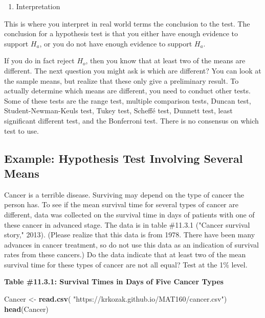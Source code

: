 \documentclass[
]{book}
\newenvironment{Shaded}{\begin{snugshade}}{\end{snugshade}}
\newcommand{\KeywordTok}[1]{\textcolor[rgb]{0.13,0.29,0.53}{\textbf{#1}}}
\newcommand{\NormalTok}[1]{#1}
\newcommand{\StringTok}[1]{\textcolor[rgb]{0.31,0.60,0.02}{#1}}
\providecommand{\tightlist}{%
  \setlength{\itemsep}{0pt}\setlength{\parskip}{0pt}}
\begin{document}
\begin{enumerate}
\def\labelenumi{\arabic{enumi}.}
\setcounter{enumi}{5}
\tightlist
\item
  Interpretation
\end{enumerate}

This is where you interpret in real world terms the conclusion to the test. The conclusion for a hypothesis test is that you either have enough evidence to support \(H_a\), or you do not have enough evidence to support \(H_a\).

If you do in fact reject \(H_o\), then you know that at least two of the means are different. The next question you might ask is which are different? You can look at the sample means, but realize that these only give a preliminary result. To actually determine which means are different, you need to conduct other tests. Some of these tests are the range test, multiple comparison tests, Duncan test, Student-Newman-Keuls test, Tukey test, Scheffé test, Dunnett test, least significant different test, and the Bonferroni test. There is no consensus on which test to use.

\hypertarget{example-hypothesis-test-involving-several-means}{%
\subsection{Example: Hypothesis Test Involving Several Means}\label{example-hypothesis-test-involving-several-means}}

Cancer is a terrible disease. Surviving may depend on the type of cancer the person has. To see if the mean survival time for several types of cancer are different, data was collected on the survival time in days of patients with one of these cancer in advanced stage. The data is in table \#11.3.1 ("Cancer survival story," 2013). (Please realize that this data is from 1978. There have been many advances in cancer treatment, so do not use this data as an indication of survival rates from these cancers.) Do the data indicate that at least two of the mean survival time for these types of cancer are not all equal? Test at the 1\% level.

\textbf{Table \#11.3.1: Survival Times in Days of Five Cancer Types}

\begin{Shaded}
\begin{Highlighting}[]
\NormalTok{Cancer <-}\StringTok{ }\KeywordTok{read.csv}\NormalTok{(}
  \StringTok{"https://krkozak.github.io/MAT160/cancer.csv"}\NormalTok{)}
\KeywordTok{head}\NormalTok{(Cancer)}
\end{Highlighting}
\end{Shaded}
\end{document}
